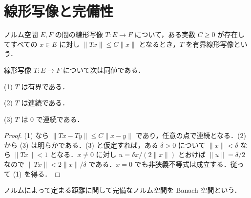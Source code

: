 \section{線形写像と完備性}
\begin{defn}[有界線形写像]
ノルム空間 $E,F$ の間の線形写像 $T:E\to F$ について，ある実数 $C\geq0$ が存在してすべての $x\in E$ に対し $\|Tx\|\leq C\|x\|$ となるとき，$T$ を有界線形写像という．
\end{defn}
\begin{prop}[有界線形写像と連続性]
線形写像 $T:E\to F$ について次は同値である．

(1) $T$ は有界である．

(2) $T$ は連続である．

(3) $T$ は $0$ で連続である．
\end{prop}
\begin{proof}
(1) なら $\|Tx-Ty\|\leq C\|x-y\|$ であり，任意の点で連続となる．(2) から (3) は明らかである．(3) と仮定すれば，ある $\delta>0$ について $\|x\|<\delta$ なら $\|Tx\|<1$ となる．$x\ne0$ に対し $u=\delta x/(2\|x\|)$ とおけば $\|u\|=\delta/2$ なので $\|Tx\|<2\|x\|/\delta$ である．$x=0$ でも非狭義不等式は成立する．従って (1) を得る．
\end{proof}
\begin{defn}[Banach空間]
ノルムによって定まる距離に関して完備なノルム空間を Banach 空間という．
\end{defn}
